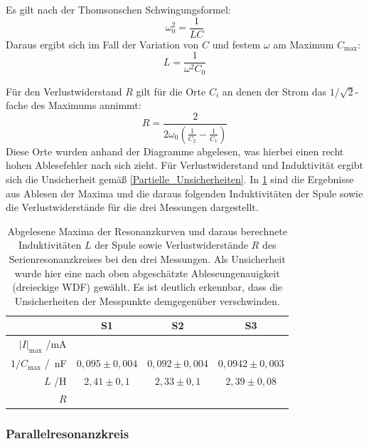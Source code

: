 \documentclass[
	a4paper,
	12pt,
	pagesize,
	ngerman
]{scrartcl}
\begin{document}
	Es gilt nach der Thomsonschen Schwingungsformel:
	\begin{equation}
		\omega_0^2=\frac{1}{LC}
	\end{equation}
	Daraus ergibt sich im Fall der Variation von $C$ und festem $\omega$ am Maximum $ C_\text{max} $:
	\begin{equation}
		L=\frac{1}{\omega^2 C_0}
		\label{Thomson}
	\end{equation}
	
	Für den Verlustwiderstand $R$ gilt für die Orte $C_i$ an denen der Strom das $ 1/\sqrt{2} $-fache des Maximums annimmt:
	\begin{equation}
		R= \frac{2}{2\omega_0 \left( \frac{1}{C_2} - \frac{1}{C_1} \right)}
	\end{equation}
	Diese Orte wurden anhand der Diagramme abgelesen, was hierbei einen recht hohen Ablesefehler nach sich zieht.
	Für Verlustwiderstand und Induktivität ergibt sich die Unsicherheit gemäß \cref{Partielle_Unsicherheiten}.
	In \cref{Serie_Erg} sind die Ergebnisse aus Ablesen der Maxima und die daraus folgenden Induktivitäten der Spule sowie die Verlustwiderstände für die drei Messungen dargestellt.
	
	\begin{table}[tb]
		\centering
		\begin{tabular}{ r | c | c | c }
			&S1 & S2 & S3 \\ \hline
			$\left| I \right|_\text{max}$ /\si{mA} & & & \\ 
			$1/C_\text{max}$ /\si{\per \nano \farad}& $0,095 \pm 0,004$ & $0,092\pm0,004 $&$0,0942\pm0,003$ \\
			$L$ /\si{\henry} & $2,41 \pm 0,1$ & $2,33\pm 0,1 $&$2,39\pm0,08$ \\
			$R$ & & & \\
		\end{tabular}
		\caption{Abgelesene Maxima der Resonanzkurven und daraus berechnete Induktivitäten $L$ der Spule sowie Verlustwiderstände $R$ des Serienresonanzkreises bei den drei Messungen. Als Unsicherheit wurde hier eine nach oben abgeschätzte Ableseungenauigkeit (dreieckige WDF) gewählt. Es ist deutlich erkennbar, dass die Unsicherheiten der Messpunkte demgegenüber verschwinden.}
		\label{Serie_Erg} 
	\end{table}
	
	\subsubsection{Parallelresonanzkreis}
	
\end{document}
